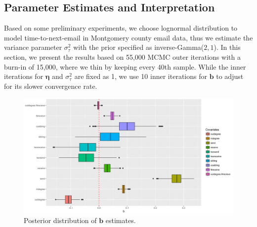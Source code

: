 \documentclass[12pt]{article}
\begin{document}
\subsection{Parameter Estimates and Interpretation}\label{subsec:Result_email}
Based on some preliminary experiments, we choose lognormal distribution to model time-to-next-email in Montgomery county email data, thus we estimate the variance parameter $\sigma_\tau^2$ with the prior specified as inverse-Gamma($2, 1$). In this section, we present the results based on 55,000 MCMC outer iterations with a burn-in of 15,000, where we thin by keeping every 40th sample. While the inner iterations for $\boldsymbol{\eta}$ and $\sigma_\tau^2$ are fixed as 1, we use 10 inner iterations for $\boldsymbol{b}$ to adjust for its slower convergence rate.
	\begin{figure}[!b]
	\centering
	\includegraphics[width=1\textwidth]{plots_paper/best-1.png}	
	\caption {Posterior distribution of $\boldsymbol{b}$ estimates.}
	\label{figure:betaresults}
\end{figure}
	
\end{document}
